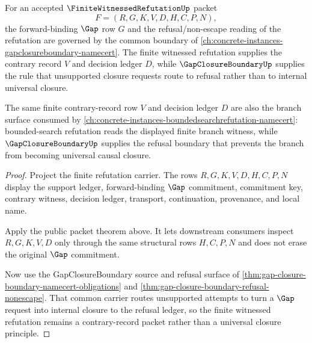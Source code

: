 \begin{theorem}
\label{thm:finite-witnessed-refutation-gap-boundary-crosslink}
For an accepted $\FiniteWitnessedRefutationUp$ packet
$$
F=(R,G,K,V,D,H,C,P,N),
$$
the forward-binding $\Gap$ row $G$ and the refusal/non-escape reading of the refutation are governed by the common boundary of \autoref{ch:concrete-instances-gapclosureboundary-namecert}. The finite witnessed refutation supplies the contrary record $V$ and decision ledger $D$, while $\GapClosureBoundaryUp$ supplies the rule that unsupported closure requests route to refusal rather than to internal universal closure.

The same finite contrary-record row $V$ and decision ledger $D$ are also the branch surface consumed by \autoref{ch:concrete-instances-boundedsearchrefutation-namecert}: bounded-search refutation reads the displayed finite branch witness, while $\GapClosureBoundaryUp$ supplies the refusal boundary that prevents the branch from becoming universal causal closure.
\end{theorem}
\begin{proof}
Project the finite refutation carrier. The rows $R,G,K,V,D,H,C,P,N$ display the support ledger, forward-binding $\Gap$ commitment, commitment key, contrary witness, decision ledger, transport, continuation, provenance, and local name.

Apply the public packet theorem above. It lets downstream consumers inspect $R,G,K,V,D$ only through the same structural rows $H,C,P,N$ and does not erase the original $\Gap$ commitment.

Now use the GapClosureBoundary source and refusal surface of \autoref{thm:gap-closure-boundary-namecert-obligations} and \autoref{thm:gap-closure-boundary-refusal-nonescape}. That common carrier routes unsupported attempts to turn a $\Gap$ request into internal closure to the refusal ledger, so the finite witnessed refutation remains a contrary-record packet rather than a universal closure principle.
\end{proof}

